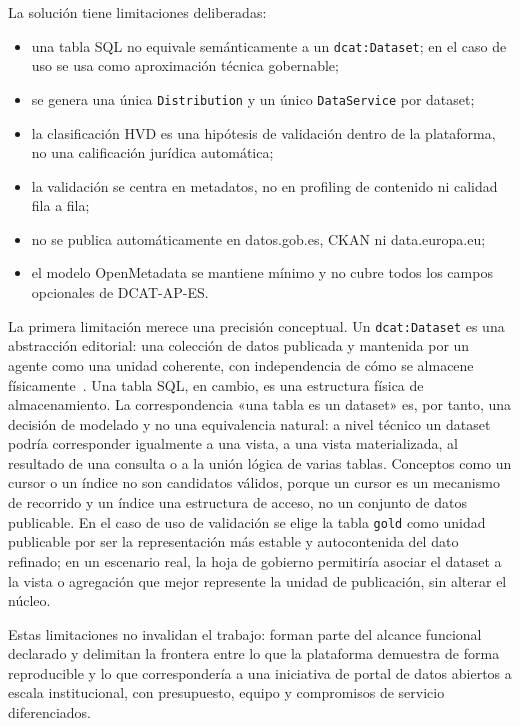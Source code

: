 La solución tiene limitaciones deliberadas:

\begin{itemize}
  \item una tabla SQL no equivale semánticamente a un \texttt{dcat:Dataset}; en el caso de uso se usa como aproximación técnica gobernable;
  \item se genera una única \texttt{Distribution} y un único \texttt{DataService} por dataset;
  \item la clasificación HVD es una hipótesis de validación dentro de la plataforma, no una calificación jurídica automática;
  \item la validación se centra en metadatos, no en profiling de contenido ni calidad fila a fila;
  \item no se publica automáticamente en datos.gob.es, CKAN ni data.europa.eu;
  \item el modelo OpenMetadata se mantiene mínimo y no cubre todos los campos opcionales de DCAT-AP-ES.
\end{itemize}

La primera limitación merece una precisión conceptual. Un \texttt{dcat:Dataset} es una abstracción editorial: una colección de datos publicada y mantenida por un agente como una unidad coherente, con independencia de cómo se almacene físicamente~\cite{w3cDcat3}. Una tabla \ac{SQL}, en cambio, es una estructura física de almacenamiento. La correspondencia «una tabla es un dataset» es, por tanto, una decisión de modelado y no una equivalencia natural: a nivel técnico un dataset podría corresponder igualmente a una vista, a una vista materializada, al resultado de una consulta o a la unión lógica de varias tablas. Conceptos como un cursor o un índice no son candidatos válidos, porque un cursor es un mecanismo de recorrido y un índice una estructura de acceso, no un conjunto de datos publicable. En el caso de uso de validación se elige la tabla \texttt{gold} como unidad publicable por ser la representación más estable y autocontenida del dato refinado; en un escenario real, la hoja de gobierno permitiría asociar el dataset a la vista o agregación que mejor represente la unidad de publicación, sin alterar el núcleo.

Estas limitaciones no invalidan el trabajo: forman parte del alcance funcional declarado y delimitan la frontera entre lo que la plataforma demuestra de forma reproducible y lo que correspondería a una iniciativa de portal de datos abiertos a escala institucional, con presupuesto, equipo y compromisos de servicio diferenciados.


